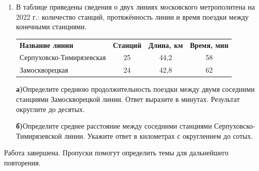 \documentclass[a4paper,12pt]{article}
\newcommand{\taskspace}{\par\vspace{0.42cm}}
\newcommand{\subtask}[2]{\par\medskip\textbf{#1}\enspace #2\par\vspace{0.22cm}}
\begin{document}
\begin{enumerate}[resume]
\taskspace

\item В таблице приведены сведения о двух линиях московского метрополитена на 2022 г.: количество станций, протяжённость линии и время поездки между конечными станциями.
\begin{center}
\renewcommand{\arraystretch}{1.22}
\begin{tabularx}{0.96\linewidth}{@{}Xccc@{}}\textbf{Название линии} & \textbf{Станций} & \textbf{Длина, км} & \textbf{Время, мин} \\
Серпуховско-Тимирязевская & 25 & 44,2 & 58 \\
Замоскворецкая & 24 & 42,8 & 62\end{tabularx}
\end{center}
\subtask{а)}{Определите среднюю продолжительность поездки между двумя соседними станциями Замоскворецкой линии. Ответ выразите в минутах. Результат округлите до десятых.}
\subtask{б)}{Определите среднее расстояние между соседними станциями Серпуховско-Тимирязевской линии. Укажите ответ в километрах с округлением до сотых.}

\taskspace

\end{enumerate}


\vfill
{\small\color{soft}Работа завершена. Пропуски помогут определить темы для дальнейшего повторения.}
\end{document}
